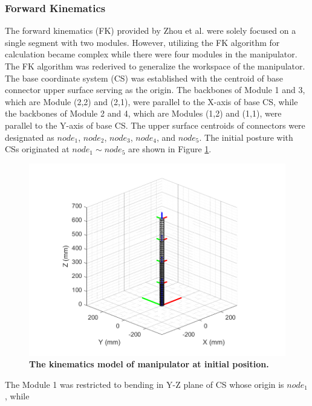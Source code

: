\subsubsection{Forward Kinematics}
The forward kinematics (FK) provided by Zhou et al. \cite{fishboneCR} were solely focused on a single segment 
with two modules. However, utilizing the FK algorithm for calculation became complex while there were four modules in 
the manipulator. The FK algorithm was rederived to generalize the workspace of the manipulator. \\
The base coordinate system (CS) was established with the centroid of base connector upper surface serving as 
the origin. The backbones of Module 1 and 3, which are Module (2,2) and (2,1), were parallel to the X-axis 
of base CS, while the backbones of Module 2 and 4, which are Modules (1,2) and (1,1), were parallel to the 
Y-axis of base CS. The upper surface centroids of connectors were designated as $node_1$, $node_2$, $node_3$, 
$node_4$, and $node_5$. The initial posture with CSs originated at $node_1 \sim node_5 $ are shown in 
Figure \ref{fig:kinematics model 0_0_0_0}.  \\
\begin{figure}[H] %
    \centering
    \captionsetup{labelsep=colon}
    \includegraphics[width=1.0\textwidth]{Image/MATLAB/manipulator_0_0_0_0.png} 
    \caption[The kinematics model of manipulator at the initial position]
    {\centering \textbf{The kinematics model of manipulator at initial position.}}
    \label{fig:kinematics model 0_0_0_0}
\end{figure}
\noindent The Module 1 was restricted to bending in Y-Z plane of CS whose origin is $node_1$, while 
